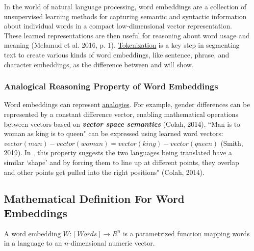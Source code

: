 In the world of natural language processing, word embeddings are a collection of unsupervised learning methods for capturing semantic and syntactic information about individual words in a compact low-dimensional vector representation. These learned representations are then useful for reasoning about word usage and meaning (Melamud et al. 2016, p. 1). 
\hyperref[nlptask:tokenization]{Tokenization} is a key step in segmenting text to create various kinds of word embeddings, like sentence, phrase, and character embeddings, as the difference between  and  will show.  


\subsubsection{Analogical Reasoning Property of Word Embeddings} \label{sec:WordEmb_AnalogyFeature}

Word embeddings can represent \hyperref[nlptask:wordanalogy]{analogies}. For example, gender differences can be represented by a constant difference vector, enabling mathematical operations between vectors based on \textbf{\emph{vector space semantics}} (Colah, 2014). ``Man is to woman as king is to queen" can be expressed using learned word vectors: $vector(man) - vector(woman) = vector(king) - vector(queen)$ (Smith, 2019). In , this property suggests the two languages being translated have a similar `shape' and by forcing them to line up at different points, they overlap and other points get pulled into the right positions" (Colah, 2014).

\subsection{Mathematical Definition For Word Embeddings}
 
A word embedding $W: [Words] \rightarrow R^n$ is a parametrized function mapping words in a language to an $n$-dimensional numeric vector. %


